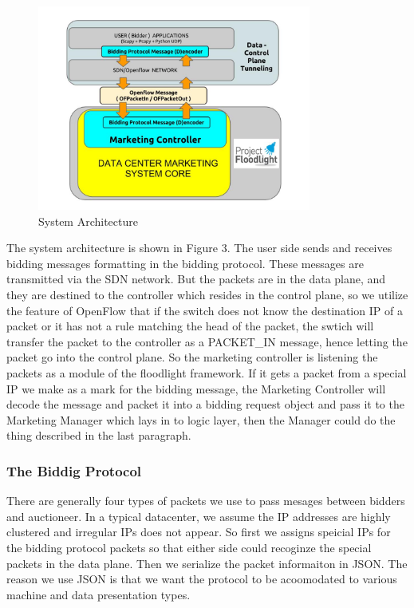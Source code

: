 \documentclass[a4paper,11pt,twocolumn]{article}
\begin{document}
\begin{figure}[ht!]
\centering
\includegraphics[width=90mm]{architecture_controller.jpg}
\caption{System Architecture}
\label{overflow}
\end{figure}

The system architecture is shown in Figure 3. The user side sends and receives bidding messages formatting in the bidding protocol. These
messages are transmitted via the SDN network. But the packets are in the data plane, and they are destined to the controller which resides
in the control plane, so we utilize the feature of OpenFlow that if the switch does not know the destination IP of a packet or it has not a rule
matching the head of the packet, the swtich will transfer the packet to the controller as a PACKET\_IN message, hence letting the packet go into
the control plane. So the marketing controller is listening the packets as a module of the floodlight framework. If it gets a packet from a 
special IP we make as a mark for the bidding message, the Marketing Controller will decode the message and packet it into a bidding request 
object and pass it to the Marketing Manager which lays in to logic layer, then the Manager could do the thing described in the last paragraph.


\subsubsection{The Biddig Protocol}
There are generally four types of packets we use to pass mesages between bidders and auctioneer. In a typical datacenter, we assume the IP addresses 
are highly clustered and irregular IPs does not appear. So first we assigns speicial IPs for the bidding protocol packets so that either side could 
recoginze the special packets in the data plane. Then we serialize the packet informaiton in JSON. The reason we use JSON is that we want the protocol to
be acoomodated to various machine and data presentation types. 
\end{document}
